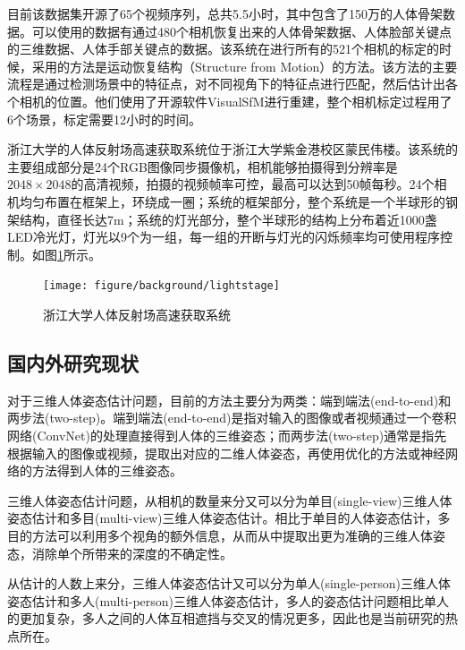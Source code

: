 
目前该数据集开源了65个视频序列，总共5.5小时，其中包含了150万的人体骨架数据。可以使用的数据有通过480个相机恢复出来的人体骨架数据、人体脸部关键点的三维数据、人体手部关键点的数据。该系统在进行所有的521个相机的标定的时候，采用的方法是运动恢复结构（Structure from Motion）的方法。该方法的主要流程是通过检测场景中的特征点，对不同视角下的特征点进行匹配，然后估计出各个相机的位置。他们使用了开源软件VisualSfM进行重建，整个相机标定过程用了6个场景，标定需要12小时的时间。

浙江大学的人体反射场高速获取系统位于浙江大学紫金港校区蒙民伟楼。该系统的主要组成部分是24个RGB图像同步摄像机，相机能够拍摄得到分辨率是\(2048\times 2048\)的高清视频，拍摄的视频帧率可控，最高可以达到50帧每秒。24个相机均匀布置在框架上，环绕成一圈；系统的框架部分，整个系统是一个半球形的钢架结构，直径长达7m；系统的灯光部分，整个半球形的结构上分布着近1000盏LED冷光灯，灯光以9个为一组，每一组的开断与灯光的闪烁频率均可使用程序控制。如图\ref{fig:lightstage}所示。
\begin{figure}[htbp]
    \centering
    \texttt{[image: figure/background/lightstage]}
    \caption{\label{fig:lightstage} 浙江大学人体反射场高速获取系统}
\end{figure}

\subsection{国内外研究现状}

对于三维人体姿态估计问题，目前的方法主要分为两类：端到端法(end-to-end)\autocite{pavlakos2017coarse}和两步法(two-step)\autocite{zhou2016sparseness}。端到端法(end-to-end)\autocite{pavlakos2017coarse}是指对输入的图像或者视频通过一个卷积网络(ConvNet)的处理直接得到人体的三维姿态；而两步法(two-step)\autocite{zhou2016sparseness}通常是指先根据输入的图像或视频，提取出对应的二维人体姿态，再使用优化的方法或神经网络的方法得到人体的三维姿态。

三维人体姿态估计问题，从相机的数量来分又可以分为单目(single-view)三维人体姿态估计和多目(multi-view)三维人体姿态估计。相比于单目的人体姿态估计，多目的方法可以利用多个视角的额外信息，从而从中提取出更为准确的三维人体姿态，消除单个所带来的深度的不确定性。

从估计的人数上来分，三维人体姿态估计又可以分为单人(single-person)三维人体姿态估计和多人(multi-person)三维人体姿态估计，多人的姿态估计问题相比单人的更加复杂，多人之间的人体互相遮挡与交叉的情况更多，因此也是当前研究的热点所在。

